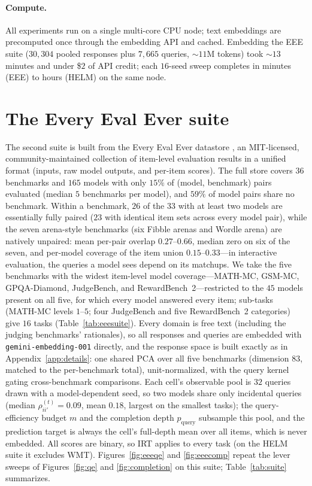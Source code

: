 \documentclass{article}
\theoremstyle{definition}
\theoremstyle{plain}
\begin{document}
\paragraph{Compute.} All experiments run on a single multi-core CPU node; text embeddings
are precomputed once through the embedding API and cached. Embedding the EEE suite
($30{,}304$ pooled responses plus $7{,}665$ queries, ${\sim}11$M tokens) took ${\sim}13$
minutes and under \$$2$ of API credit; each $16$-seed sweep completes in minutes (EEE) to
hours (HELM) on the same node.


\section{The Every Eval Ever suite}
\label{app:eee}

The second suite is built from the Every Eval Ever datastore \citep{eee2026}, an
MIT-licensed, community-maintained collection of item-level evaluation results in a
unified format (inputs, raw model outputs, and per-item scores). The full store
covers $36$ benchmarks and $165$ models with only $15\%$ of (model, benchmark)
pairs evaluated (median $5$ benchmarks per model), and $59\%$ of model pairs share
no benchmark. Within a benchmark, $26$ of the $33$ with at least two models are
essentially fully paired ($23$ with identical item sets across every model pair),
while the seven arena-style benchmarks (six Fibble arenas and Wordle arena) are
natively unpaired: mean per-pair overlap $0.27$--$0.66$, median zero on six of the
seven, and per-model coverage of the item union $0.15$--$0.33$---in interactive
evaluation, the queries a model sees depend on its matchups. We take the five benchmarks with the
widest item-level model coverage---MATH-MC, GSM-MC, GPQA-Diamond, JudgeBench, and
RewardBench~2---restricted to the $45$ models present on all five, for which every
model answered every item; sub-tasks (MATH-MC
levels $1$--$5$; four JudgeBench and five RewardBench~2 categories) give $16$ tasks
(Table~\ref{tab:eeesuite}). Every domain is free text (including the
judging benchmarks' rationales), so all responses and queries are embedded with
\texttt{gemini-embedding-001} directly, and the response space is built exactly as in
Appendix~\ref{app:details}: one shared PCA over all five benchmarks (dimension $83$,
matched to the per-benchmark total), unit-normalized, with the query kernel gating
cross-benchmark comparisons. Each cell's observable pool is $32$ queries drawn with a
model-dependent seed, so two models share only incidental queries (median
$\rho_{ii'}^{(t)}=0.09$, mean $0.18$, largest on the smallest tasks); the
query-efficiency budget $m$ and the completion depth $p_{\mathrm{query}}$ subsample this
pool, and the prediction target is always the cell's full-depth mean over all items, which
is never embedded.
All scores are binary, so IRT applies to every task (on the HELM suite it excludes WMT).
Figures~\ref{fig:eeeqe} and \ref{fig:eeecomp} repeat the lever sweeps of
Figures~\ref{fig:qe} and \ref{fig:completion} on this suite; Table~\ref{tab:suite}
summarizes.
\end{document}
